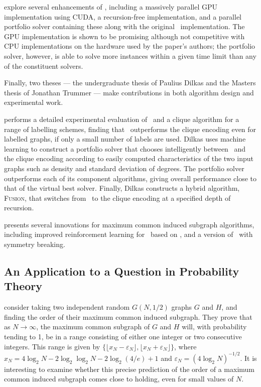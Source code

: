 \citet{DBLP:journals/computation/QuerMS20}
explore several enhancements of \McSplit,
including a massively parallel GPU implementation using CUDA, a recursion-free implementation,
and a parallel portfolio solver containing these along with the original \McSplit\
implementation.  The GPU implementation is shown to be promising although not competitive
with CPU implementations on the hardware used by the paper's authors; the portfolio solver,
however, is able to solve more instances within a given time limit than any of the
constituent solvers.

Finally, two theses --- the undergraduate thesis of Paulius Dilkas and
the Masters thesis of Jonathan Trummer --- make contributions
in both algorithm design and experimental work.

\citet{dilkas2018} performs a detailed experimental evaluation
of \McSplit\ and a clique algorithm for a range of labelling schemes, finding that \McSplit\
outperforms the clique encoding even for labelled graphs, if only a small number of labels are
used.  Dilkas uses machine learning to construct a portfolio solver that chooses intelligently
between \McSplit\ and the clique encoding according to easily computed characteristics of the
two input graphs such as density and standard deviation of degrees. The portfolio solver
outperforms each of its component algorithms, giving overall performance close to that of the virtual
best solver.  Finally, Dilkas constructs a hybrid algorithm, \textsc{Fusion}, that switches
from \McSplit\ to the clique encoding at a specified depth of recursion.

\cite{trummer2021} presents several innovations for maximum common induced subgraph algorithms,
including improved reinforcement learning for \McSplit\ based on
\citet{DBLP:conf/aaai/0001LJ020}, and a version of \McSplit\ with symmetry breaking.

\subsection{An Application to a Question in Probability Theory}

\citet{chatterjee2021isomorphisms} consider taking two
independent random $G(N, 1/2)$ graphs $G$ and $H$, and finding the order of their maximum
common induced subgraph.  They prove that as $N\to\infty$, the maximum common
subgraph of $G$ and $H$ will, with probability tending to 1, be in a range
consisting of either one integer or two consecutive integers.  This range
is given by $\{\lfloor x_N - \varepsilon_N\rfloor, \lfloor x_N + \varepsilon_N\rfloor\}$,
where $x_N = 4 \log_2 N - 2 \log_2\log_2 N - 2 \log_2(4/e) + 1$
and $\varepsilon_N = (4 \log_2 N)^{-1/2}$.  It is interesting to examine whether
this precise prediction of the order of a maximum common induced subgraph
comes close to holding, even for small values of $N$.

